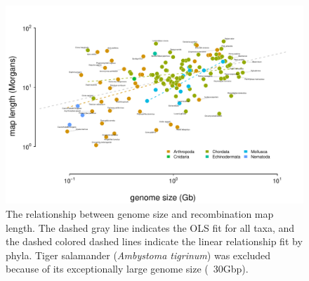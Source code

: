 \documentclass[11pt]{article}
\begin{document}
\begin{figure}[!htb]
  \centering
  \includegraphics[width=\textwidth]{figures/genome_size_maplength.pdf}

  \caption{The relationship between genome size and recombination map length.
    The dashed gray line indicates the OLS fit for all taxa, and the dashed
    colored dashed lines indicate the linear relationship fit by phyla. Tiger
    salamander (\emph{Ambystoma tigrinum}) was excluded because of its
  exceptionally large genome size (~30Gbp).}

  \label{supfig:genome_size_maplength}
\end{figure}
\end{document}

